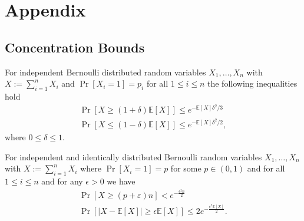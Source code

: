 \chapter{Appendix}
\section{Concentration Bounds}
\begin{lemma}
For independent Bernoulli distributed random variables $X_1, \dotsc, X_n$ with $X := \sum_{i=1}^n X_i$
and $\Pr[X_i = 1] = p_i$ for all $ 1 \leq  i \leq n$ the following inequalities hold
\begin{gather}
\label{ineq:ch0}
\Pr[X \geq (1+\delta) \mathbb{E}[X]] \leq e^{- \mathbb{E}[X] \delta^2/3} \\
\label{ineq:ch1}
\Pr[X \leq (1-\delta) \mathbb{E}[X]] \leq e^{- \mathbb{E}[X] \delta^2/2},
\end{gather}
where $0 \leq \delta \leq 1$.

For independent and identically distributed Bernoulli random variables $X_1, \dotsc, X_n$ with $X := \sum_{i=1}^n X_i$
where $\Pr[X_i = 1] = p$ for some $p \in (0,1)$ and for all $ 1 \leq  i \leq n$ and
for any $\epsilon > 0$ we have
\begin{gather}
\label{ineq:ch3}
\Pr[X \geq (p + \varepsilon)n] < e^{-\frac{\epsilon^2n}{2}} \\
\label{ineq:ch2}
\Pr[| X - \mathbb{E}[X]| \geq \epsilon\mathbb{E}[X]] \leq 2e^{-\frac{\epsilon^2 \mathbb{E}[X]}{2}}.
\end{gather}
\end{lemma}
\vspace*{\fill}
\pagebreak


